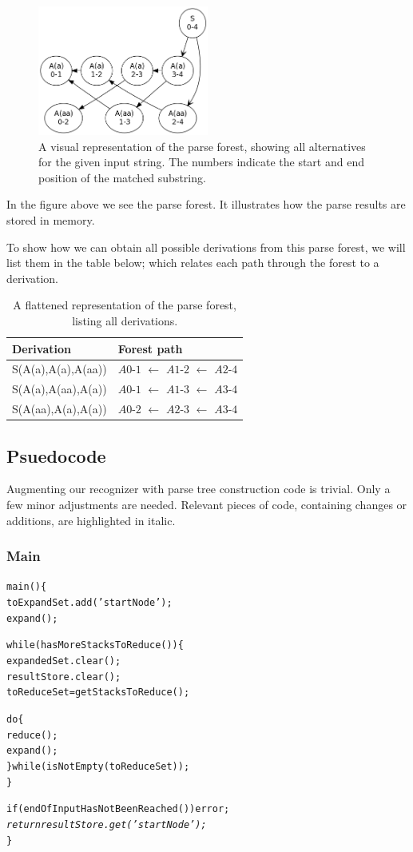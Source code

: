 \documentclass[a4paper,10pt]{article}
\begin{document}
\begin{figure}[H]
\centering
\includegraphics[width=0.5\textwidth]{a_aa-forest.png}
\caption{A visual representation of the parse forest, showing all alternatives for the given input string. The numbers indicate the start and end position of the matched substring.}
\end{figure}

In the figure above we see the parse forest. It illustrates how the parse results are stored in memory.

To show how we can obtain all possible derivations from this parse forest, we will list them in the table below; which relates each path through the forest to a derivation.

\begin{table}[H]
\centering
\begin{tabular}{ p{15em} p{15em} }
Derivation & Forest path\\
\hline
S(A(a),A(a),A(aa)) & $A0$-$1$ $\leftarrow$ $A1$-$2$ $\leftarrow$ $A2$-$4$\\
S(A(a),A(aa),A(a)) & $A0$-$1$ $\leftarrow$ $A1$-$3$ $\leftarrow$ $A3$-$4$\\
S(A(aa),A(a),A(a)) & $A0$-$2$ $\leftarrow$ $A2$-$3$ $\leftarrow$ $A3$-$4$
\end{tabular}
\caption{A flattened representation of the parse forest, listing all derivations.}
\end{table}

\pagebreak
\subsection{Psuedocode}

Augmenting our recognizer with parse tree construction code is trivial. Only a few minor adjustments are needed. Relevant pieces of code, containing changes or additions, are highlighted in italic.

\subsubsection{Main}
{\small
\begin{alltt}
main()\{
  toExpandSet.add('startNode');
  expand();
  
  while(hasMoreStacksToReduce())\{
    expandedSet.clear();
    resultStore.clear();
    toReduceSet = getStacksToReduce();
    
    do\{
       reduce();
       expand();
    \}while(isNotEmpty(toReduceSet));
  \}
  
  if(endOfInputHasNotBeenReached()) error;
  \textit{
  return resultStore.get('startNode');}
\}
\end{alltt}
}
\end{document}
